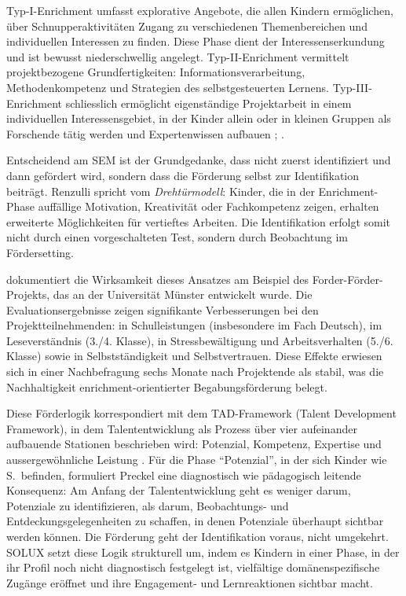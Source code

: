 \documentclass[ngerman, a4paper]{article}
\begin{document}
Typ-I-Enrichment umfasst explorative Angebote, die allen Kindern ermöglichen, über
Schnupperaktivitäten Zugang zu verschiedenen Themenbereichen und individuellen
Interessen zu finden. Diese Phase dient der Interessenserkundung und ist bewusst
niederschwellig angelegt. Typ-II-Enrichment vermittelt projektbezogene Grundfertigkeiten:
Informationsverarbeitung, Methodenkompetenz und Strategien des selbstgesteuerten Lernens.
Typ-III-Enrichment schliesslich ermöglicht eigenständige Projektarbeit in einem
individuellen Interessensgebiet, in der Kinder allein oder in kleinen Gruppen als
Forschende tätig werden und Expertenwissen aufbauen
\parencite{muelleroppliger2021handbuch};
\parencite[S.\,101--104]{hoyer2013begabung}.

Entscheidend am SEM ist der Grundgedanke, dass nicht zuerst identifiziert und dann
gefördert wird, sondern dass die Förderung selbst zur Identifikation beiträgt.
Renzulli spricht vom \textit{Drehtürmodell}: Kinder, die in der Enrichment-Phase
auffällige Motivation, Kreativität oder Fachkompetenz zeigen, erhalten erweiterte
Möglichkeiten für vertieftes Arbeiten. Die Identifikation erfolgt somit nicht durch
einen vorgeschalteten Test, sondern durch Beobachtung im Fördersetting.

\textcite[S.\,254--273]{fischer2020begabungsfoerderung} dokumentiert die Wirksamkeit dieses Ansatzes am Beispiel des
Forder-Förder-Projekts, das an der Universität Münster entwickelt wurde. Die
Evaluationsergebnisse zeigen signifikante Verbesserungen bei den
Projektteilnehmenden: in Schulleistungen (insbesondere im Fach Deutsch), im
Leseverständnis (3./4. Klasse), in Stressbewältigung und Arbeitsverhalten
(5./6. Klasse) sowie in Selbstständigkeit und Selbstvertrauen. Diese Effekte
erwiesen sich in einer Nachbefragung sechs Monate nach Projektende als stabil,
was die Nachhaltigkeit enrichment-orientierter Begabungsförderung belegt.

Diese Förderlogik korrespondiert mit dem TAD-Framework (Talent Development
Framework), in dem Talententwicklung als Prozess über vier aufeinander
aufbauende Stationen beschrieben wird: Potenzial, Kompetenz, Expertise und
aussergewöhnliche Leistung \parencite{preckel2021tad}. Für die Phase
\enquote{Potenzial}, in der sich Kinder wie S.\ befinden, formuliert Preckel
eine diagnostisch wie pädagogisch leitende Konsequenz: Am Anfang der
Talententwicklung geht es weniger darum, Potenziale zu identifizieren, als
darum, Beobachtungs- und Entdeckungsgelegenheiten zu schaffen, in denen
Potenziale überhaupt sichtbar werden können. Die Förderung geht der
Identifikation voraus, nicht umgekehrt. SOLUX setzt diese Logik strukturell
um, indem es Kindern in einer Phase, in der ihr Profil noch nicht
diagnostisch festgelegt ist, vielfältige domänenspezifische Zugänge
eröffnet und ihre Engagement- und Lernreaktionen sichtbar macht.
\end{document}
